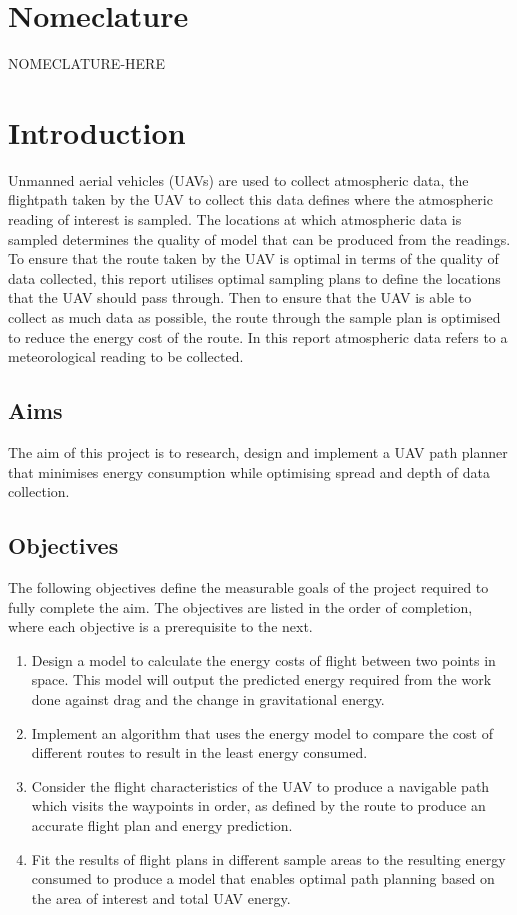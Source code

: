 \documentclass[a4paper,12pt,twoside]{article}
\begin{document}
\section*{Nomeclature}
NOMECLATURE-HERE
\clearpage
\section{Introduction}
\label{sec:introduction}

Unmanned aerial vehicles (UAVs) are used to collect atmospheric data, the flightpath taken by the UAV to collect this data defines where the atmospheric reading of interest is sampled. The locations at which atmospheric data is sampled determines the quality of model that can be produced from the readings. To ensure that the route taken by the UAV is optimal in terms of the quality of data collected, this report utilises optimal sampling plans to define the locations that the UAV should pass through. Then to ensure that the UAV is able to collect as much data as possible, the route through the sample plan is optimised to reduce the energy cost of the route. In this report atmospheric data refers to a meteorological reading to be collected.

\subsection{Aims}
\label{sec:aims}

The aim of this project is to research, design and implement a UAV path planner that minimises energy consumption while optimising spread and depth of data collection.

\subsection{Objectives}
\label{sec:objectives}

The following objectives define the measurable goals of the project required to fully complete the aim. The objectives are listed in the order of completion, where each objective is a prerequisite to the next.

\begin{enumerate}
\setlength{\itemsep}{-12pt}
\item Design a model to calculate the energy costs of flight between two points in space. This model will output the predicted energy required from the work done against drag and the change in gravitational energy.
\item Implement an algorithm that uses the energy model to compare the cost of different routes to result in the least energy consumed.
\item Consider the flight characteristics of the UAV to produce a navigable path which visits the waypoints in order, as defined by the route to produce an accurate flight plan and energy prediction.
\item Fit the results of flight plans in different sample areas to the resulting energy consumed to produce a model that enables optimal path planning based on the area of interest and total UAV energy.

\end{enumerate}
\end{document}
